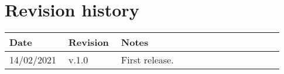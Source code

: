\chapter*{Revision history}

\begin{center}
	\begin{tabular}{@{}p{0.18\linewidth} p{0.18\linewidth} p{0.57\linewidth}@{}}
		\toprule
		\textbf{Date} & \textbf{Revision} & \textbf{Notes}\\
		\midrule
		14/02/2021 & v.1.0 & First release.\\
		\bottomrule
	\end{tabular}
\end{center}